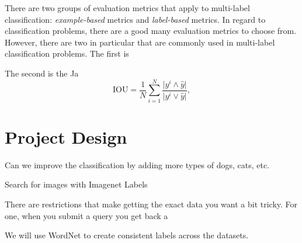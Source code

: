 \documentclass[10pt, a4paper, twocolumn]{article} %
\begin{document}
There are two groups of evaluation metrics that apply to multi-label classification: \textit{example-based} metrics and \textit{label-based} metrics.
In regard to classification problems, there are a good many evaluation metrics to choose from. However, there are two in particular that are commonly used in multi-label classification problems.  The first is

The second is the Ja
\begin{equation}
\mathrm{IOU} = \frac{1}{N}\sum_{i=1}^{N}\frac{\vert y^i \wedge \hat{y} \vert}{\vert y^i \vee \hat{y} \vert}, \label{eq:IOU}
\end{equation}


\section{Project Design} %


Can we improve the classification by adding more types of dogs, cats, etc.

Search for images with Imagenet Labels

There are restrictions that make getting the exact data you want a bit tricky.  For one, when you submit a query you get back a  

We will use WordNet to create consistent labels across the datasets.
\end{document}
